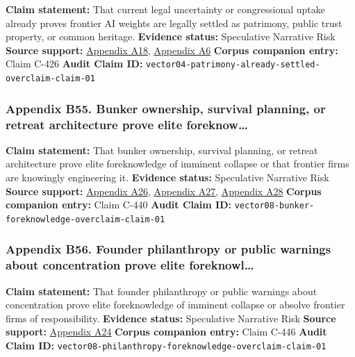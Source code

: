 \documentclass[
  american,
  11pt,
  letterpaper,
]{article}
\begin{document}
\textbf{Claim statement:} That current legal uncertainty or
congressional uptake already proves frontier AI weights are legally
settled as patrimony, public trust property, or common heritage.
\textbf{Evidence status:} Speculative Narrative Risk \textbf{Source
support:}
\hyperref[appendix-a18-bipartisan-house-task-force-report-on-artificial-intelligence]{Appendix
A18},
\hyperref[appendix-a6-copyright-and-artificial-intelligence-part-3-generative-ai-training-pre-publication-version]{Appendix
A6} \textbf{Corpus companion entry:} Claim C-426 \textbf{Audit Claim
ID:} \texttt{vector04-patrimony-already-settled-overclaim-claim-01}

\subsubsection{Appendix B55. Bunker ownership, survival planning, or
retreat architecture prove elite
foreknow\ldots{}}\label{appendix-b55-bunker-ownership-survival-planning-or-retreat-architecture-prove-elite-foreknow}

\textbf{Claim statement:} That bunker ownership, survival planning, or
retreat architecture prove elite foreknowledge of imminent collapse or
that frontier firms are knowingly engineering it. \textbf{Evidence
status:} Speculative Narrative Risk \textbf{Source support:}
\hyperref[appendix-a26-sam-altman-s-manifest-destiny]{Appendix A26},
\hyperref[appendix-a27-inside-mark-zuckerbergs-top-secret-hawaii-compound]{Appendix
A27},
\hyperref[appendix-a28-new-zealand-woos-the-wealthy-with-golden-visa-changes]{Appendix
A28} \textbf{Corpus companion entry:} Claim C-440 \textbf{Audit Claim
ID:} \texttt{vector08-bunker-foreknowledge-overclaim-claim-01}

\subsubsection{Appendix B56. Founder philanthropy or public warnings
about concentration prove elite
foreknowl\ldots{}}\label{appendix-b56-founder-philanthropy-or-public-warnings-about-concentration-prove-elite-foreknowl}

\textbf{Claim statement:} That founder philanthropy or public warnings
about concentration prove elite foreknowledge of imminent collapse or
absolve frontier firms of responsibility. \textbf{Evidence status:}
Speculative Narrative Risk \textbf{Source support:}
\hyperref[appendix-a24-the-adolescence-of-technology]{Appendix A24}
\textbf{Corpus companion entry:} Claim C-446 \textbf{Audit Claim ID:}
\texttt{vector08-philanthropy-foreknowledge-overclaim-claim-01}
\end{document}
